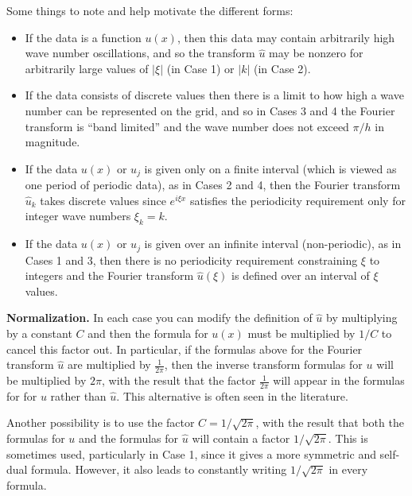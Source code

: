 \documentclass[11pt]{article}
\begin{document}
\newpage
\noindent 
Some things to note and help motivate the different forms:
\begin{itemize}
\item If the data is a function $u(x)$, then this data may contain
arbitrarily high wave number oscillations, and so the transform $\hat u$ may
be nonzero for arbitrarily large values of
$|\xi|$ (in Case 1) or $|k|$ (in Case 2).

\item If the data consists of discrete values then there is a limit to how
high a wave number can be represented on the grid, and so in Cases 3 and 4
the Fourier transform is ``band limited'' and the wave number does not
exceed $\pi / h$ in magnitude.  

\item If the data $u(x)$ or $u_j$ is given only on a finite interval (which
is viewed as
one period of periodic data), as in Cases 2 and 4, then the Fourier
transform $\hat u_k$ takes discrete values since $e^{i\xi x}$ satisfies
the periodicity requirement only for integer wave numbers $\xi_k=k$. 

\item If the data $u(x)$ or $u_j$ is given over an infinite interval
(non-periodic), as in Cases 1 and 3,
then there is no periodicity requirement constraining $\xi$ to integers
and the Fourier transform $\hat u(\xi)$ is defined over
an interval of $\xi$ values. 
\end{itemize}

\vskip 10pt
\noindent 
{\bf Normalization.}
\vskip 5pt
In each case you can modify the definition of $\hat u$ by
multiplying by a constant $C$ and then the formula for $u(x)$ must be
multiplied by $1/C$ to cancel this factor out.  In particular, if the
formulas above for the Fourier transform
$\hat u$ are multiplied by $\frac 1 {2\pi}$, then the
inverse transform formulas for $u$ will be multiplied by $2\pi$, with the
result that the factor $\frac 1{2\pi}$ will appear in the formulas for 
for $u$ rather than $\hat u$.  This alternative is often seen in the
literature.

Another possibility is to use the factor $C = 1/\sqrt{2\pi}$, with the
result that both the formulas for $u$ and the formulas for $\hat u$ 
will contain a
factor $1/\sqrt{2\pi}$. This is sometimes used, particularly in Case 1,
since it gives a more symmetric and self-dual formula.  However, it also
leads to constantly writing $1/\sqrt{2\pi}$ in every formula.
\end{document}
